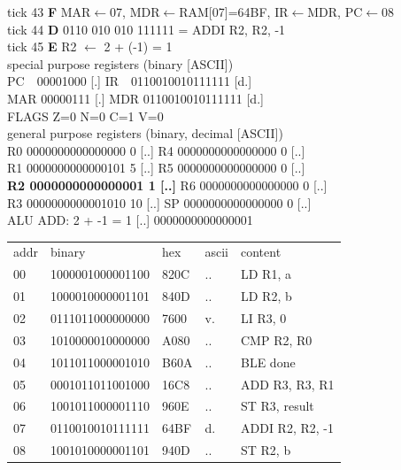 \noindent\begin{tcolorbox}[stepbox, title={Instruction 15 \hfill ticks 43 to 45 \quad ADDI R2, R2, -1}]
\textcolor{dim}{tick 43} \textbf{F} MAR$\leftarrow$07, MDR$\leftarrow$RAM[07]=64BF, IR$\leftarrow$MDR, PC$\leftarrow$08\\
\textcolor{dim}{tick 44} \textbf{D} 0110 010 010 111111 = ADDI R2, R2, -1\\
\textcolor{dim}{tick 45} \textbf{E} R2 $\leftarrow$ 2 + (-1) = 1\\[2pt]
\textcolor{dim}{special purpose registers (binary [ASCII])}\\
PC~~00001000 [.] \hfill IR~~0110010010111111 [d.]\\
MAR 00000111 [.] \hfill MDR 0110010010111111 [d.]\\
FLAGS Z=0 N=0 C=1 V=0\\[2pt]
\textcolor{dim}{general purpose registers (binary, decimal [ASCII])}\\
R0 0000000000000000 0 [..] \hfill R4 0000000000000000 0 [..]\\
R1 0000000000000101 5 [..] \hfill R5 0000000000000000 0 [..]\\
\textcolor{wrt}{\textbf{R2 0000000000000001 1 [..]}} \hfill R6 0000000000000000 0 [..]\\
R3 0000000000001010 10 [..] \hfill SP 0000000000000000 0 [..]\\
\textcolor{dim}{ALU} ADD: 2 + -1 = 1 [..] \hfill 0000000000000001\\[2pt]
{\setlength{\tabcolsep}{2pt}\begin{tabular}{@{}lllll@{}}
\textcolor{dim}{addr} & \textcolor{dim}{binary} & \textcolor{dim}{hex} & \textcolor{dim}{ascii} & \textcolor{dim}{content}\\
00 & 1000001000001100 & 820C & .. & LD R1, a\\
01 & 1000010000001101 & 840D & .. & LD R2, b\\
02 & 0111011000000000 & 7600 & v. & LI R3, 0\\
03 & 1010000010000000 & A080 & .. & CMP R2, R0\\
04 & 1011011000001010 & B60A & .. & BLE done\\
05 & 0001011011001000 & 16C8 & .. & ADD R3, R3, R1\\
06 & 1001011000001110 & 960E & .. & ST R3, result\\
07 & 0110010010111111 & 64BF & d. & ADDI R2, R2, -1\\
\rowcolor{pcc}08 & 1001010000001101 & 940D & .. & ST R2, b\\

\end{tabular}}
\end{tcolorbox}
